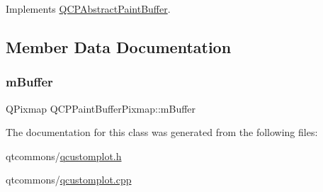 Implements \mbox{\hyperlink{class_q_c_p_abstract_paint_buffer_a9e9f29b19c033cf02fb96f1a148463f3}{Q\+C\+P\+Abstract\+Paint\+Buffer}}.



\subsection{Member Data Documentation}
\mbox{\label{class_q_c_p_paint_buffer_pixmap_a6d7009f45f03e305f2dc00e52a9225f8}} 
\subsubsection{\texorpdfstring{mBuffer}{mBuffer}}
{\footnotesize\ttfamily Q\+Pixmap Q\+C\+P\+Paint\+Buffer\+Pixmap\+::m\+Buffer\hspace{0.3cm}{\ttfamily [protected]}}



The documentation for this class was generated from the following files\+:\begin{DoxyCompactItemize}
\item 
qtcommons/\mbox{\hyperlink{qcustomplot_8h}{qcustomplot.\+h}}\item 
qtcommons/\mbox{\hyperlink{qcustomplot_8cpp}{qcustomplot.\+cpp}}\end{DoxyCompactItemize}
